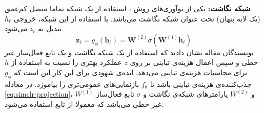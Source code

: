 \noindent\textbf{شبکه نگاشت:}
یکی از نوآوری‌های روش ،
استفاده از یک شبکه تماما متصل کم‌عمق (یک لایه پنهان) تحت عنوان شبکه نگاشت می‌باشد. با استفاده از این شبکه، خروجی $h_\ell$
تبدیل به $z_\ell$ می‌شود.
\begin{equation}
\label{eq:simclr-projection}
\boldsymbol{z}_\ell = g_\phi(\boldsymbol{h}_\ell) = \boldsymbol{W}^{(2)} \sigma(\boldsymbol{W}^{(1)} \boldsymbol{h}_\ell)
\end{equation}
نویسندگان مقاله نشان دادند که استفاده از یک شبکه نگاشت و یک تابع فعال‌ساز غیر خطی و سپس اعمال هزینه‌ی تباینی بر روی
$z$
عملکرد بهتری را نسبت به استفاده از
$h$
برای محاسبات هزینه‌ی تباینی می‌دهد. ایده‌ی شهودی برای این کار این است که
$g_\phi$
جذب‌کننده‌ی هزینه‌ی تباینی باشد تا
$f_\theta$
بازنمایی‌های عمومی‌تری را بیاموزد.
در معادله \ref{eq:simclr-projection}،
$W^{(1)}$ و $W^{(2)}$ پارامترهای شبکه‌ی نگاشت و
$\sigma$ تابع فعال‌ساز غیر خطی می‌باشد که معمولا از تابع  استفاده می‌شود.

